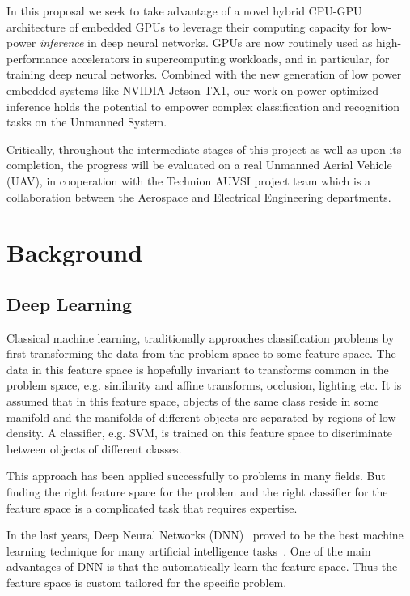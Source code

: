 \documentclass{article} %
\begin{document}
In this proposal we seek to take advantage of a novel hybrid CPU-GPU architecture of embedded GPUs
to leverage their computing capacity for low-power \emph{inference} in deep
neural networks. GPUs are now routinely used as high-performance
accelerators in supercomputing workloads, and in particular, for training deep
neural networks. Combined with the new generation of low power
embedded systems like NVIDIA Jetson TX1,  our work on power-optimized
inference holds the potential to empower complex classification and recognition
tasks on the Unmanned System.

Critically, throughout the intermediate stages of this project as well as upon
its completion, the progress will be evaluated on a real Unmanned Aerial Vehicle (UAV), in
cooperation with the Technion AUVSI project team which is a collaboration
between the Aerospace and Electrical Engineering departments.

\section{Background}

\subsection{Deep Learning}
\label{sec:deep_learning}

Classical machine learning, traditionally approaches classification problems by
first transforming the data from the problem space to some feature space. The
data in this feature space is hopefully invariant to transforms common in the
problem space, e.g. similarity and affine transforms, occlusion, lighting etc.
It is assumed that in this feature space, objects of the same class reside in
some manifold and the manifolds of different objects are separated by regions of
low density. A classifier, e.g. SVM, is trained on this feature space to
discriminate between objects of different classes.

This approach has been applied successfully to problems in many fields. But
finding the right feature space for the problem and the right classifier for the
feature space is a complicated task that requires expertise.

In the last years, Deep Neural Networks (DNN)~\cite{Bengio2009, LeCun2015} proved to
be the best machine learning technique for  many artificial intelligence
tasks~\cite{hadsell2009learning, eigen2014depth, ross2013learning}. One of the
main advantages of DNN is that the automatically learn the feature space. Thus
the feature space is custom tailored for the specific problem.
\end{document}
